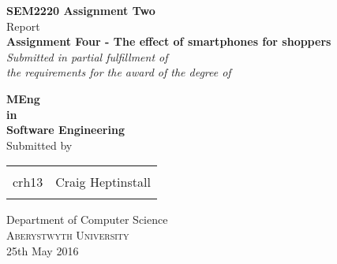 \begin{titlepage}

\begin{center}

\textup{\small {\bf SEM2220 Assignment Two} \\ Report}\\[0.2in]

\Large \textbf {Assignment Four - The effect of smartphones for shoppers }\\[0.5in]

       \small \emph{Submitted in partial fulfillment of\\
        the requirements for the award of the degree of}
        \vspace{.2in}

       {\bf MEng  \\in\\ Software Engineering}\\[0.5in]

\normalsize Submitted by \\
\begin{table}[h]
\centering
\begin{tabular}{lr}\hline \\
crh13 & Craig Heptinstall  \\ \\ \hline 
\end{tabular}
\end{table}

\vspace{.1in}

\Large{Department of Computer Science}\\
\normalsize
\textsc{Aberystwyth University}\\
\vspace{4.2cm}
25th May 2016

\end{center}

\end{titlepage}
